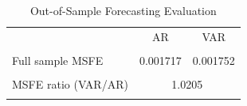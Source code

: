 \begin{table}[htbp]\centering
\caption{Out-of-Sample Forecasting Evaluation}
\begin{tabular}{lcc}
\hline\hline
 & AR & VAR \\\\
\hline
Full sample MSFE & 0.001717 & 0.001752 \\\\
MSFE ratio (VAR/AR) & \multicolumn{2}{c}{1.0205} \\\\
\hline\hline
\end{tabular}
\end{table}
